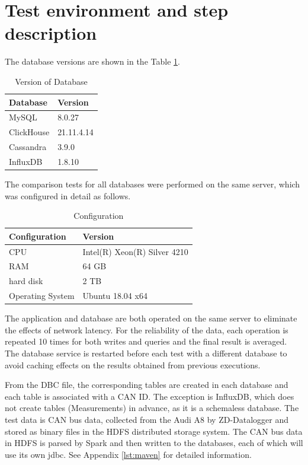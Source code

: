 \section{Test environment and step description}

The database versions are shown in the Table \ref{tab:version_database}.

\begin{table}[hbt!]
\centering
\begin{tabular}{@{}ll@{}}
\toprule
Database           & Version    \\ \midrule
MySQL      & 8.0.27     \\
ClickHouse & 21.11.4.14 \\
Cassandra  & 3.9.0      \\
InfluxDB   & 1.8.10     \\ \bottomrule
\end{tabular}
\caption{Version of Database}
\label{tab:version_database}
\end{table}

The comparison tests for all databases were performed on the same server, which was configured in detail as follows. 
\begin{table}[hbt!]
\centering
\begin{tabular}{@{}ll@{}}
\toprule
Configuration           & Version    \\ \midrule
CPU      & Intel(R) Xeon(R) Silver 4210   \\
RAM & 64 GB \\
hard disk  & 2 TB      \\
Operating System   & Ubuntu 18.04 x64     \\ \bottomrule
\end{tabular}
\caption{Configuration}
\label{tab:configuration}
\end{table}

The application and database are both operated on the same server to eliminate the effects of network latency. For the reliability of the data, each operation is repeated 10 times for both writes and queries and the final result is averaged. The database service is restarted before each test with a different database to avoid caching effects on the results obtained from previous executions.



From the DBC file, the corresponding tables are created in each database and each table is associated with a CAN ID. The exception is InfluxDB, which does not create tables (Measurements) in advance, as it is a schemaless database. The test data is CAN bus data, collected from the Audi A8 by ZD-Datalogger and stored as binary files in the HDFS distributed storage system.
The CAN bus data in HDFS is parsed by Spark and then written to the databases, each of which will use its own \ac{jdbc}. See Appendix \ref{lst:maven} for detailed information.

